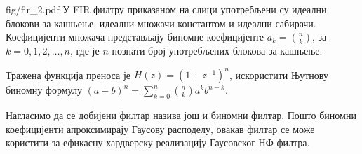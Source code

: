 
\begin{slikaDesno}{fig/fir_2.pdf}
    \PID У FIR филтру приказаном на слици употребљени су идеални блокови за кашњење, идеални множачи константом и идеални сабирачи.
    Коефицијенти множача представљају биномне коефицијенте $a_k = \binom{n}{k}$, за $k = 0,1,2,\ldots,n$, где је $n$ познати број 
    употребљених блокова за кашњење. 
\end{slikaDesno}

\REZULTAT
Тражена функција преноса је 
$H(z) = (1 + z^{-1})^n$, искористити Њутнову биномну формулу 
$(a + b)^n = \sum_{k = 0}^{n} \binom{n}{k} a^k b^{n-k}$. 

Нагласимо да се добијени филтар назива још и биномни филтар. Пошто биномни коефицијенти апроксимирају Гаусову расподелу, овакав филтар се може 
користити за ефикасну хардверску реализацију Гаусовског НФ филтра.